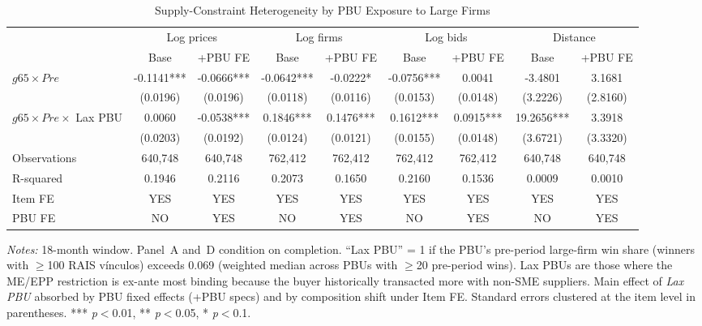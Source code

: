 \begin{table}[htbp]
\centering
\caption{Supply-Constraint Heterogeneity by PBU Exposure to Large Firms}
\label{tab:enforcement}
\begin{adjustbox}{max width=\textwidth}
\begin{threeparttable}
\small
\begin{tabular}{lcccccccc}
\toprule
 & \multicolumn{2}{c}{Log prices} & \multicolumn{2}{c}{Log firms}
 & \multicolumn{2}{c}{Log bids} & \multicolumn{2}{c}{Distance} \\
\cmidrule(lr){2-3} \cmidrule(lr){4-5} \cmidrule(lr){6-7} \cmidrule(lr){8-9}
 & Base & +PBU FE & Base & +PBU FE & Base & +PBU FE & Base & +PBU FE \\
\midrule
$g65 \times Pre$ & -0.1141*** & -0.0666*** & -0.0642*** & -0.0222* & -0.0756*** & 0.0041 & -3.4801 & 3.1681 \\
 & (0.0196) & (0.0196) & (0.0118) & (0.0116) & (0.0153) & (0.0148) & (3.2226) & (2.8160) \\
$g65 \times Pre \times$ Lax PBU & 0.0060 & -0.0538*** & 0.1846*** & 0.1476*** & 0.1612*** & 0.0915*** & 19.2656*** & 3.3918 \\
 & (0.0203) & (0.0192) & (0.0124) & (0.0121) & (0.0155) & (0.0148) & (3.6721) & (3.3320) \\
\midrule
Observations & 640,748 & 640,748 & 762,412 & 762,412 & 762,412 & 762,412 & 640,748 & 640,748 \\
R-squared & 0.1946 & 0.2116 & 0.2073 & 0.1650 & 0.2160 & 0.1536 & 0.0009 & 0.0010 \\
Item FE & YES & YES & YES & YES & YES & YES & YES & YES \\
PBU FE & NO & YES & NO & YES & NO & YES & NO & YES \\
\bottomrule
\end{tabular}
\begin{tablenotes}
\small
\item \textit{Notes:} 18-month window. Panel~A and~D condition on completion.
``Lax PBU'' = 1 if the PBU's pre-period large-firm win share (winners with $\geq$100 RAIS vínculos) exceeds 0.069 (weighted median across PBUs with $\geq$20 pre-period wins).
Lax PBUs are those where the ME/EPP restriction is ex-ante most binding because
the buyer historically transacted more with non-SME suppliers.
Main effect of \textit{Lax PBU} absorbed by PBU fixed effects (+PBU specs) and by composition shift under Item FE.
Standard errors clustered at the item level in parentheses.
*** \textit{p}$<$0.01, ** \textit{p}$<$0.05, * \textit{p}$<$0.1.
\end{tablenotes}
\end{threeparttable}
\end{adjustbox}
\end{table}
